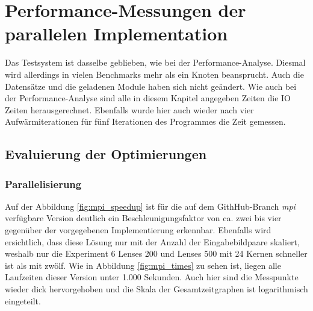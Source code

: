 \chapter{Performance-Messungen der parallelen Implementation}

Das Testsystem ist dasselbe geblieben, wie bei der Performance-Analyse. Diesmal wird allerdings in vielen Benchmarks mehr als ein Knoten beansprucht. Auch die Datensätze und die geladenen Module haben sich nicht geändert. Wie auch bei der Performance-Analyse sind alle in diesem Kapitel angegeben Zeiten die \gls{IO} Zeiten herausgerechnet. Ebenfalls wurde hier auch wieder nach vier Aufwärmiterationen für fünf Iterationen des Programmes die Zeit gemessen. 


\section{Evaluierung der Optimierungen}

\subsection{Parallelisierung}

Auf der Abbildung \ref{fig:mpi_speedup} \cite{Coj17} ist für die auf dem GithHub-Branch \textit{mpi} verfügbare Version deutlich ein Beschleunigungsfaktor von ca. zwei bis vier gegenüber der vorgegebenen Implementierung erkennbar. Ebenfalls wird ersichtlich, dass diese Lösung nur mit der Anzahl der Eingabebildpaare skaliert, weshalb nur die Experiment 6 Lenses 200 und Lenses 500 mit 24 Kernen schneller ist als mit zwölf. Wie in Abbildung \ref{fig:mpi_times} zu sehen ist, liegen alle Laufzeiten dieser Version unter 1.000 Sekunden. Auch hier sind die Messpunkte wieder dick hervorgehoben und die Skala der Gesamtzeitgraphen ist logarithmisch eingeteilt. 

